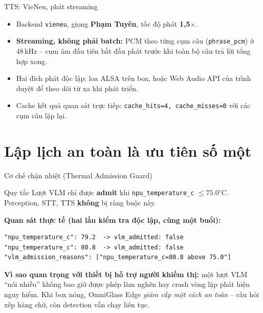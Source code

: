 \documentclass[aspectratio=169]{beamer}
\begin{document}
\begin{frame}{TTS: VieNeu, phát streaming}
  \begin{itemize}
    \item Backend \texttt{vieneu}, giọng \textbf{Phạm Tuyên}, tốc độ phát
          \textbf{1,5$\times$}.
    \item \textbf{Streaming, không phải batch:} PCM theo từng cụm câu
          (\texttt{phrase\_pcm}) ở 48\,kHz -- cụm âm đầu tiên bắt đầu phát trước
          khi toàn bộ câu trả lời tổng hợp xong.
    \item Hai đích phát độc lập: loa ALSA trên box, hoặc Web Audio API của
          trình duyệt để theo dõi từ xa khi phát triển.
    \item Cache kết quả quan sát trực tiếp: \texttt{cache\_hits=4,
          cache\_misses=0} với các cụm câu lặp lại.
  \end{itemize}
\end{frame}

\section{Lập lịch an toàn là ưu tiên số một}

\begin{frame}[fragile]{Cơ chế chặn nhiệt (Thermal Admission Guard)}
  \begin{block}{Quy tắc}
    Lượt VLM chỉ được \textbf{admit} khi \texttt{npu\_temperature\_c}
    $\le 75.0^\circ$C. Perception, STT, TTS \textbf{không} bị ràng buộc này.
  \end{block}
  \pause
  \vspace{6pt}
  \textbf{Quan sát thực tế (hai lần kiểm tra độc lập, cùng một buổi):}
  \begin{lstlisting}
"npu_temperature_c": 79.2  -> vlm_admitted: false
"npu_temperature_c": 80.8  -> vlm_admitted: false
"vlm_admission_reasons": ["npu_temperature_c=80.8 above 75.0"]
\end{lstlisting}
  \pause
  \vspace{6pt}
  \textbf{Vì sao quan trọng với thiết bị hỗ trợ người khiếm thị:} một lượt VLM
  ``nói nhiều'' không bao giờ được phép làm nghẽn hay crash vòng lặp phát hiện
  nguy hiểm. Khi box nóng, OmniGlass Edge \emph{giảm cấp một cách an toàn} --
  câu hỏi xếp hàng chờ, còn detection vẫn chạy liên tục.
\end{frame}

\end{document}
